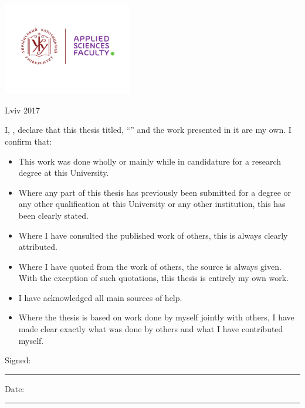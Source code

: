 \documentclass[
12pt, %
oneside, %
english, %
onehalfspacing, %
nolistspacing, %
liststotoc, %
parskip, %
headsepline, %
]{MastersDoctoralThesis} %
\begin{document}
\begin{titlepage}
\begin{center}
\includegraphics[height=4cm]{UCU-Apps.png} %

{\large Lviv 2017}\\[2cm] %
 
\vfill
\end{center}
\end{titlepage}


\begin{declaration}
\addchaptertocentry{\authorshipname} %
\noindent I, \authorname, declare that this thesis titled, \enquote{\ttitle} and the work presented in it are my own. I confirm that:

\begin{itemize} 
\item This work was done wholly or mainly while in candidature for a research degree at this University.
\item Where any part of this thesis has previously been submitted for a degree or any other qualification at this University or any other institution, this has been clearly stated.
\item Where I have consulted the published work of others, this is always clearly attributed.
\item Where I have quoted from the work of others, the source is always given. With the exception of such quotations, this thesis is entirely my own work.
\item I have acknowledged all main sources of help.
\item Where the thesis is based on work done by myself jointly with others, I have made clear exactly what was done by others and what I have contributed myself.\\
\end{itemize}
 
\noindent Signed:\\
\rule[0.5em]{25em}{0.5pt} %
 
\noindent Date:\\
\rule[0.5em]{25em}{0.5pt} %
\end{declaration}
\end{document}
